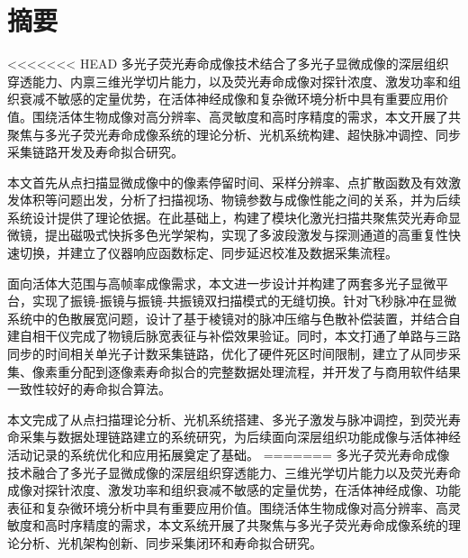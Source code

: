 
\maketitle%
\MAKETITLE%
\makedeclaration%
\intobmk\chapter*{摘\quad 要}%
\setcounter{page}{1}%

<<<<<<< HEAD
多光子荧光寿命成像技术结合了多光子显微成像的深层组织穿透能力、内禀三维光学切片能力，以及荧光寿命成像对探针浓度、激发功率和组织衰减不敏感的定量优势，在活体神经成像和复杂微环境分析中具有重要应用价值。围绕活体生物成像对高分辨率、高灵敏度和高时序精度的需求，本文开展了共聚焦与多光子荧光寿命成像系统的理论分析、光机系统构建、超快脉冲调控、同步采集链路开发及寿命拟合研究。

本文首先从点扫描显微成像中的像素停留时间、采样分辨率、点扩散函数及有效激发体积等问题出发，分析了扫描视场、物镜参数与成像性能之间的关系，并为后续系统设计提供了理论依据。在此基础上，构建了模块化激光扫描共聚焦荧光寿命显微镜，提出磁吸式快拆多色光学架构，实现了多波段激发与探测通道的高重复性快速切换，并建立了仪器响应函数标定、同步延迟校准及数据采集流程。

面向活体大范围与高帧率成像需求，本文进一步设计并构建了两套多光子显微平台，实现了振镜-振镜与振镜-共振镜双扫描模式的无缝切换。针对飞秒脉冲在显微系统中的色散展宽问题，设计了基于棱镜对的脉冲压缩与色散补偿装置，并结合自建自相干仪完成了物镜后脉宽表征与补偿效果验证。同时，本文打通了单路与三路同步的时间相关单光子计数采集链路，优化了硬件死区时间限制，建立了从同步采集、像素重分配到逐像素寿命拟合的完整数据处理流程，并开发了与商用软件结果一致性较好的寿命拟合算法。

本文完成了从点扫描理论分析、光机系统搭建、多光子激发与脉冲调控，到荧光寿命采集与数据处理链路建立的系统研究，为后续面向深层组织功能成像与活体神经活动记录的系统优化和应用拓展奠定了基础。
=======
多光子荧光寿命成像技术融合了多光子显微成像的深层组织穿透能力、三维光学切片能力以及荧光寿命成像对探针浓度、激发功率和组织衰减不敏感的定量优势，在活体神经成像、功能表征和复杂微环境分析中具有重要应用价值。围绕活体生物成像对高分辨率、高灵敏度和高时序精度的需求，本文系统开展了共聚焦与多光子荧光寿命成像系统的理论分析、光机架构创新、同步采集闭环和寿命拟合研究。

